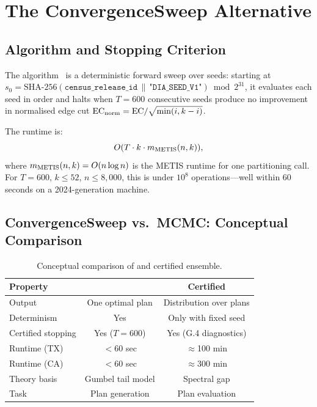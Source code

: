 \section{The ConvergenceSweep Alternative}
\label{sec:sweep}

\subsection{Algorithm and Stopping Criterion}

The \cs{} algorithm~\citep{b16paper} is a deterministic forward sweep
over seeds: starting at $s_0 = \mathrm{SHA\text{-}256}(\texttt{census\_release\_id}
\,\|\, \texttt{"DIA\_SEED\_V1"}) \bmod 2^{31}$,
it evaluates each seed in order and halts when $T = 600$ consecutive
seeds produce no improvement in normalised edge cut
$\mathrm{EC}_{\rm norm} = \mathrm{EC} / \sqrt{\min(i, k-i)}$.

The runtime is:
\[
  O(T \cdot k \cdot m_{\rm METIS}(n, k)),
\]
where $m_{\rm METIS}(n,k) = O(n \log n)$ is the METIS runtime for one
partitioning call.
For $T = 600$, $k \leq 52$, $n \leq 8{,}000$, this is under $10^8$
operations---well within 60 seconds on a 2024-generation machine.

\subsection{ConvergenceSweep vs.\ MCMC: Conceptual Comparison}

\begin{table}[h]
\centering
\caption{Conceptual comparison of \cs{} and certified \recom{} ensemble.}
\label{tab:comparison}
\begin{tabular}{lcc}
\toprule
Property & \cs{} & Certified \recom{} \\
\midrule
Output & One optimal plan & Distribution over plans \\
Determinism & Yes & Only with fixed seed \\
Certified stopping & Yes ($T=600$) & Yes (G.4 diagnostics) \\
Runtime (TX) & $<$60 sec & $\approx$100 min \\
Runtime (CA) & $<$60 sec & $\approx$300 min \\
Theory basis & Gumbel tail model & Spectral gap \\
Task & Plan generation & Plan evaluation \\
\bottomrule
\end{tabular}
\end{table}

